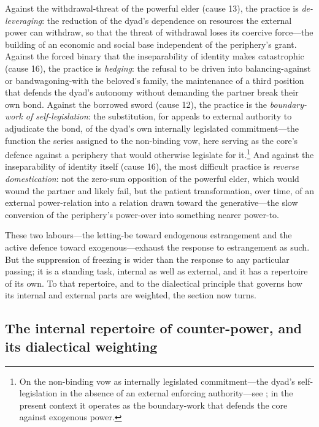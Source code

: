 Against the withdrawal-threat of the powerful elder (cause 13), the practice is \emph{de-leveraging}: the reduction of the dyad's dependence on resources the external power can withdraw, so that the threat of withdrawal loses its coercive force---the building of an economic and social base independent of the periphery's grant. Against the forced binary that the inseparability of identity makes catastrophic (cause 16), the practice is \emph{hedging}: the refusal to be driven into balancing-against or bandwagoning-with the beloved's family, the maintenance of a third position that defends the dyad's autonomy without demanding the partner break their own bond. Against the borrowed sword (cause 12), the practice is the \emph{boundary-work of self-legislation}: the substitution, for appeals to external authority to adjudicate the bond, of the dyad's own internally legislated commitment---the function the series assigned to the non-binding vow, here serving as the core's defence against a periphery that would otherwise legislate for it.\footnote{On the non-binding vow as internally legislated commitment---the dyad's self-legislation in the absence of an external enforcing authority---see \textcite{paperxiii}; in the present context it operates as the boundary-work that defends the core against exogenous power.} And against the inseparability of identity itself (cause 16), the most difficult practice is \emph{reverse domestication}: not the zero-sum opposition of the powerful elder, which would wound the partner and likely fail, but the patient transformation, over time, of an external power-relation into a relation drawn toward the generative---the slow conversion of the periphery's power-over into something nearer power-to.

\noindent
These two labours---the letting-be toward endogenous estrangement and the active defence toward exogenous---exhaust the response to estrangement as such. But the suppression of freezing is wider than the response to any particular passing; it is a standing task, internal as well as external, and it has a repertoire of its own. To that repertoire, and to the dialectical principle that governs how its internal and external parts are weighted, the section now turns.

\subsection{The internal repertoire of counter-power, and its dialectical weighting}
\label{p17:sub:praxis-inner}


